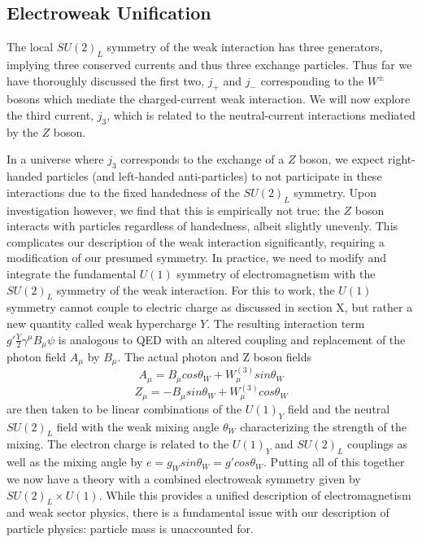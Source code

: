 \subsection{Electroweak Unification}

The local $SU(2)_L$ symmetry of the weak interaction has three generators, implying three conserved currents and thus 
three exchange particles. Thus far we have thoroughly discussed the first two,  $j_+$ and $j_-$ corresponding to the 
$W^{\pm}$ bosons which mediate the charged-current weak interaction. We will now explore the third current, $j_3$, 
which is related to the neutral-current interactions mediated by the $Z$ boson.  \par

In a universe where $j_3$ corresponds to the exchange of a $Z$ boson, we expect right-handed particles (and 
left-handed anti-particles) to not participate in these interactions due to the fixed handedness of the $SU(2)_L$ 
symmetry. Upon investigation however, we find that this is empirically not true: the $Z$ boson interacts with particles 
regardless of handedness, albeit slightly unevenly. This complicates our description of the weak interaction significantly, 
requiring a modification of our presumed symmetry. In practice, we need to modify and integrate the fundamental 
$U(1)$ symmetry of electromagnetism with the $SU(2)_L$ symmetry of the weak interaction. For this to work, the 
$U(1)$ symmetry cannot couple to electric charge as discussed in section X, but rather a new quantity called weak 
hypercharge $Y$. The resulting interaction term $g'\frac{Y}{2}\gamma^{\mu}B_{\mu}\psi$ is analogous to QED with 
an altered coupling and replacement of the photon field $A_{\mu}$ by $B_{\mu}$. The actual photon and Z boson 
fields
\begin{equation}
A_{\mu} = B_{\mu}cos\theta_W + W^{(3)}_{\mu}sin\theta_W
\end{equation}
\begin{equation}
Z_{\mu} = -B_{\mu}sin\theta_W+W^{(3)}_{\mu}cos\theta_W
\end{equation}
are then taken to be linear combinations of the $U(1)_Y$ field and the neutral $SU(2)_L$ field with the weak mixing 
angle $\theta_W$ characterizing the strength of the mixing. The electron charge is related to the $U(1)_Y$ and 
$SU(2)_L$ couplings as well as the mixing angle by $e = g_Wsin\theta_W = g'cos\theta_W$. Putting all of this 
together we now have a theory with a combined electroweak symmetry given by $SU(2)_L \times U(1)$. While 
this provides a unified description of electromagnetism and weak sector physics, there is a fundamental issue with our 
description of particle physics: particle mass is unaccounted for.

